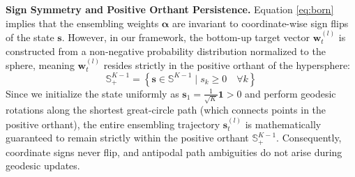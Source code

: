 \textbf{Sign Symmetry and Positive Orthant Persistence.} Equation \eqref{eq:born} implies that the ensembling weights $\boldsymbol{\alpha}$ are invariant to coordinate-wise sign flips of the state $\mathbf{s}$. However, in our framework, the bottom-up target vector $\mathbf{w}_t^{(l)}$ is constructed from a non-negative probability distribution normalized to the sphere, meaning $\mathbf{w}_t^{(l)}$ resides strictly in the positive orthant of the hypersphere:
\begin{equation}
\mathbb{S}^{K-1}_+ = \left\{ \mathbf{s} \in \mathbb{S}^{K-1} \mid s_k \ge 0 \quad \forall k \right\}
\end{equation}
Since we initialize the state uniformly as $\mathbf{s}_1 = \frac{1}{\sqrt{K}}\mathbf{1} > 0$ and perform geodesic rotations along the shortest great-circle path (which connects points in the positive orthant), the entire ensembling trajectory $\mathbf{s}_t^{(l)}$ is mathematically guaranteed to remain strictly within the positive orthant $\mathbb{S}^{K-1}_+$. Consequently, coordinate signs never flip, and antipodal path ambiguities do not arise during geodesic updates.

